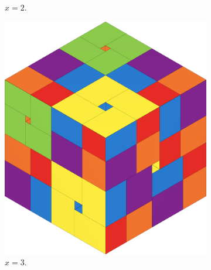 \begin{figure}[ht]
\begin{subfigure}[b]{0.47\textwidth}
        \caption*{$x = 2$.}
    \end{subfigure}
    \par\bigskip
    \begin{subfigure}[b]{0.47\textwidth}
        \centering
        \includegraphics[scale=0.18]{graphics/4d-universal-cube-3.png}
        \caption*{$x = 3$.}
    \end{subfigure}
    ~
    \begin{subfigure}[b]{0.47\textwidth}
        \centering

\end{subfigure}
\end{figure}
